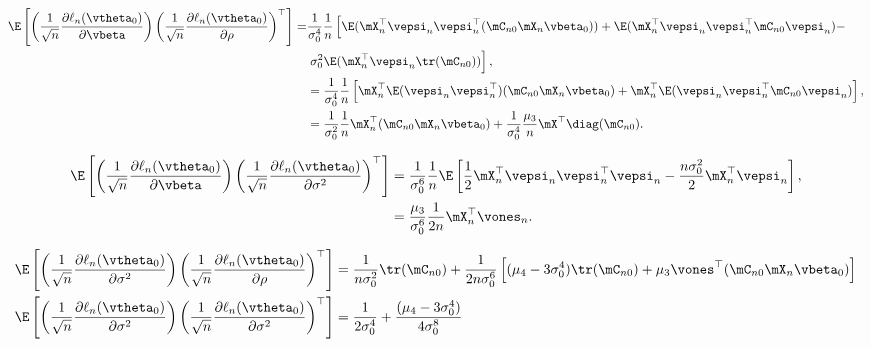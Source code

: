 \documentclass[english,12pt]{book}\usepackage[]{graphicx}\usepackage[]{xcolor}
\begin{document}
\begin{subappendices}
\begin{equation}
\begin{aligned}
\E\left[\left(\frac{1}{\sqrt{n}}\frac{\partial \ell_n(\vtheta_0)}{\partial \vbeta}\right) \left(\frac{1}{\sqrt{n}}\frac{\partial \ell_n(\vtheta_0)}{\partial \rho}\right)^\top\right]  = &  \frac{1}{\sigma_0^4}\frac{1}{n}\left[\E(\mX_n^\top\vepsi_n\vepsi_n^\top(\mC_{n0}\mX_n\vbeta_0)) + \E(\mX_n^\top\vepsi_n\vepsi_n^\top\mC_{n0}\vepsi_n) - \right. \\
& \left. \sigma_0^2\E(\mX_n^\top\vepsi_n\tr(\mC_{n0})) \right], \\
& = \frac{1}{\sigma_0^4}\frac{1}{n}\left[\mX_n^\top\E(\vepsi_n\vepsi_n^\top)(\mC_{n0}\mX_n\vbeta_0) + \mX_n^\top\E(\vepsi_n\vepsi_n^\top\mC_{n0}\vepsi_n)\right], \\
& = \frac{1}{\sigma_0^2}\frac{1}{n}\mX_n^\top(\mC_{n0}\mX_n\vbeta_0) + \frac{1}{\sigma_0^4}\frac{\mu_3}{n}\mX^\top\diag(\mC_{n0}).
\end{aligned}
\end{equation}

\begin{equation}
\begin{aligned}
\E\left[\left(\frac{1}{\sqrt{n}}\frac{\partial \ell_n(\vtheta_0)}{\partial \vbeta}\right) \left(\frac{1}{\sqrt{n}}\frac{\partial \ell_n(\vtheta_0)}{\partial \sigma^2}\right)^\top\right] & = \frac{1}{\sigma_0^6}\frac{1}{n}\E\left[\frac{1}{2}\mX_n^\top\vepsi_n\vepsi_n^\top\vepsi_n - \frac{n\sigma_0^2}{2}\mX_n^\top\vepsi_n\right], \\
& = \frac{\mu_3}{\sigma_0^6}\frac{1}{2n}\mX_n^\top\vones_n.
\end{aligned}
\end{equation}

\begin{equation}
\begin{aligned}
\E\left[\left(\frac{1}{\sqrt{n}}\frac{\partial \ell_n(\vtheta_0)}{\partial \sigma^2}\right) \left(\frac{1}{\sqrt{n}}\frac{\partial \ell_n(\vtheta_0)}{\partial \rho}\right)^\top\right] & =  \frac{1}{n\sigma_0^2}\tr(\mC_{n0})+ \frac{1}{2n\sigma_0^6}\left[(\mu_4 - 3\sigma_0^4)\tr(\mC_{n0}) + \mu_3\vones^\top(\mC_{n0}\mX_n\vbeta_0)\right] \\
\E\left[\left(\frac{1}{\sqrt{n}}\frac{\partial \ell_n(\vtheta_0)}{\partial \sigma^2}\right) \left(\frac{1}{\sqrt{n}}\frac{\partial \ell_n(\vtheta_0)}{\partial \sigma^2}\right)^\top\right] & = \frac{1}{2\sigma_0^4}+ \frac{(\mu_4 - 3\sigma_0^4)}{4\sigma_0^8}
\end{aligned}
\end{equation}


\end{subappendices}
\end{document}

